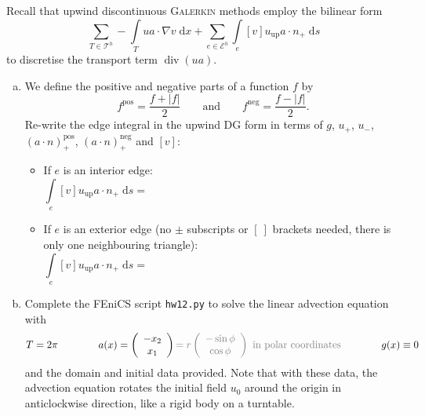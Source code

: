 \documentclass[10pt,letterpaper]{scrartcl}
\newcommand{\dx}{\;\mathrm{d}x}
\newcommand{\ds}{\;\mathrm{d}s}
\begin{document}
Recall that upwind discontinuous \textsc{Galerkin} methods employ the bilinear form
\begin{equation*}
\sum_{T\in\mathcal{T}^h} -\int\limits_T ua \cdot \nabla v \dx + \sum_{e\in\mathcal{E}^h} \int\limits_e [v] u_\text{up} a \cdot n_+ \ds
\end{equation*}
to discretise the transport term $\operatorname{div} (ua)$.
\begin{enumerate}[(a)]
\item We define the positive and negative parts of a function $f$ by
\begin{equation*}
f^\text{pos} = \frac{f + \lvert f \rvert}{2} \qquad \text{and} \qquad f^\text{neg} = \frac{f - \lvert f \rvert}{2}.
\end{equation*}
Re-write the edge integral in the upwind DG form in terms of $g$, $u_+$, $u_-$, $(a\cdot n)_+^\text{pos}$, $(a\cdot n)_+^\text{neg}$ and $[v]$:
\begin{itemize}
\item If $e$ is an interior edge:
\begin{equation*}
\int\limits_e [v] u_\text{up} a \cdot n_+ \ds = \hspace{35em}
\end{equation*}
\vfill
\item If $e$ is an exterior edge (no $\pm$ subscripts or $[\:]$ brackets needed, there is only one neighbouring triangle):
\begin{equation*}
\int\limits_e [v] u_\text{up} a \cdot n_+ \ds = \hspace{35em}
\end{equation*}
\vfill
\end{itemize}

\newpage

\item Complete the \textsf{FEniCS} script \texttt{hw12.py} to solve the linear advection equation with
\begin{equation*}
T = 2\pi \qquad \qquad a(x) = \left(
\begin{array}{c}
-x_2\\ x_1
\end{array}
\right) \textcolor{gray}{ = r \left(
\begin{array}{c}
-\sin \phi \\ \cos \phi
\end{array}
\right)  \text{ in polar coordinates}}  \qquad \qquad  g(x) \equiv 0
\end{equation*}
and the domain and initial data provided. Note that with these data, the advection equation rotates the initial field $u_0$ around the origin in anticlockwise direction, like a rigid body on a turntable.


\end{enumerate}
\end{document}
